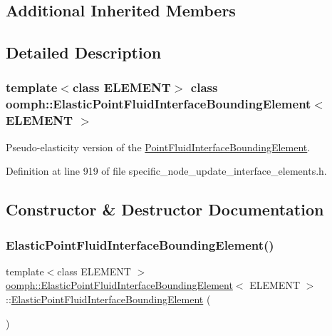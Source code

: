 \subsection*{Additional Inherited Members}


\subsection{Detailed Description}
\subsubsection*{template$<$class E\+L\+E\+M\+E\+NT$>$\newline
class oomph\+::\+Elastic\+Point\+Fluid\+Interface\+Bounding\+Element$<$ E\+L\+E\+M\+E\+N\+T $>$}

Pseudo-\/elasticity version of the \hyperlink{classoomph_1_1PointFluidInterfaceBoundingElement}{Point\+Fluid\+Interface\+Bounding\+Element}. 

Definition at line 919 of file specific\+\_\+node\+\_\+update\+\_\+interface\+\_\+elements.\+h.



\subsection{Constructor \& Destructor Documentation}
\mbox{\label{classoomph_1_1ElasticPointFluidInterfaceBoundingElement_a18e40e63a31953ad02cb0a2e7d0577b3}} 
\subsubsection{\texorpdfstring{Elastic\+Point\+Fluid\+Interface\+Bounding\+Element()}{ElasticPointFluidInterfaceBoundingElement()}}
{\footnotesize\ttfamily template$<$class E\+L\+E\+M\+E\+NT $>$ \\
\hyperlink{classoomph_1_1ElasticPointFluidInterfaceBoundingElement}{oomph\+::\+Elastic\+Point\+Fluid\+Interface\+Bounding\+Element}$<$ E\+L\+E\+M\+E\+NT $>$\+::\hyperlink{classoomph_1_1ElasticPointFluidInterfaceBoundingElement}{Elastic\+Point\+Fluid\+Interface\+Bounding\+Element} (\begin{DoxyParamCaption}{ }\end{DoxyParamCaption})\hspace{0.3cm}{\ttfamily [inline]}}



